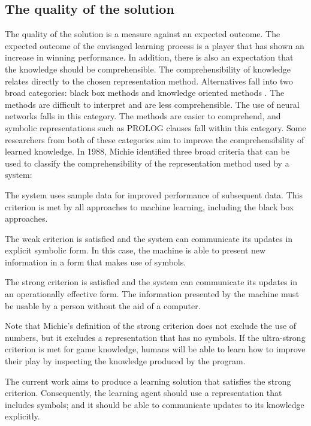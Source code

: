 \subsection*{The quality of the solution} 
The quality of the solution is a measure against an expected outcome.  The expected outcome of the envisaged learning process is a player that has shown an increase in winning performance.  In addition, there is also an expectation that the knowledge should be comprehensible. The comprehensibility of knowledge relates directly to the chosen representation method. Alternatives fall into two broad categories:   black box methods and knowledge oriented methods \cite{kubat:review}.  The  methods are difficult to interpret and are less comprehensible.  The use of neural networks falls in this category.  The  methods are easier to comprehend, and symbolic representations such as PROLOG clauses fall within this category.  Some researchers from both of these categories aim to improve the comprehensibility of learned knowledge. In 1988, Michie \cite{michie:next}  identified three broad criteria that can be used to classify the comprehensibility of the representation method used by a system:
\begin{mydesclist}
\item[Weak criterion.\ ] 
The system uses sample data for improved performance of subsequent data.  This criterion is met by all approaches to machine learning, including the black box approaches.
\item[Strong criterion.\ ]
The weak criterion is satisfied and the system can communicate its updates in explicit symbolic form.  In this case, the machine is able to present new information in a form that makes use of symbols.
\item[Ultra-strong criterion.\ ]
The strong criterion is satisfied and the system can communicate its updates in an operationally effective form.  The information presented by the machine must be usable by a person without the aid of a computer.  
\end{mydesclist}

Note that Michie's definition of the strong criterion does not exclude the use of numbers, but it excludes a representation that has no symbols.  If the ultra-strong criterion is met for game knowledge, humans will be able to learn how to improve their play by inspecting the knowledge produced by the program.

The current work aims to produce a learning solution that satisfies the strong criterion.  Consequently, the learning agent should use a representation that includes symbols; and it should be able to communicate updates to its knowledge explicitly.  

